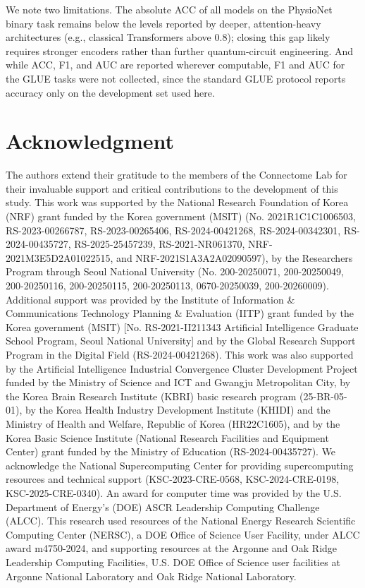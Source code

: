 \documentclass[conference]{IEEEtran}
\begin{document}
We note two limitations. The absolute ACC of all models on the PhysioNet binary task remains below the levels reported by deeper, attention-heavy architectures (e.g., classical Transformers above $0.8$); closing this gap likely requires stronger encoders rather than further quantum-circuit engineering. And while ACC, F1, and AUC are reported wherever computable, F1 and AUC for the GLUE tasks were not collected, since the standard GLUE protocol reports accuracy only on the development set used here.


\section*{\textbf{Acknowledgment}}
The authors extend their gratitude to the members of the Connectome Lab for their invaluable support and critical contributions to the development of this study. This work was supported by the National Research Foundation of Korea (NRF) grant funded by the Korea government (MSIT) (No. 2021R1C1C1006503, RS-2023-00266787, RS-2023-00265406, RS-2024-00421268, RS-2024-00342301, RS-2024-00435727, RS-2025-25457239, RS-2021-NR061370, NRF-2021M3E5D2A01022515, and NRF-2021S1A3A2A02090597), by the Researchers Program through Seoul National University (No. 200-20250071, 200-20250049, 200-20250116, 200-20250115, 200-20250113, 0670-20250039, 200-20260009). Additional support was provided by the Institute of Information \& Communications Technology Planning \& Evaluation (IITP) grant funded by the Korea government (MSIT) [No. RS-2021-II211343 Artificial Intelligence Graduate School Program, Seoul National University] and by the Global Research Support Program in the Digital Field (RS-2024-00421268). This work was also supported by the Artificial Intelligence Industrial Convergence Cluster Development Project funded by the Ministry of Science and ICT and Gwangju Metropolitan City, by the Korea Brain Research Institute (KBRI) basic research program (25-BR-05-01), by the Korea Health Industry Development Institute (KHIDI) and the Ministry of Health and Welfare, Republic of Korea (HR22C1605), and by the Korea Basic Science Institute (National Research Facilities and Equipment Center) grant funded by the Ministry of Education (RS-2024-00435727). We acknowledge the National Supercomputing Center for providing supercomputing resources and technical support (KSC-2023-CRE-0568, KSC-2024-CRE-0198, KSC-2025-CRE-0340). An award for computer time was provided by the U.S. Department of Energy’s (DOE) ASCR Leadership Computing Challenge (ALCC). This research used resources of the National Energy Research Scientific Computing Center (NERSC), a DOE Office of Science User Facility, under ALCC award m4750-2024, and supporting resources at the Argonne and Oak Ridge Leadership Computing Facilities, U.S. DOE Office of Science user facilities at Argonne National Laboratory and Oak Ridge National Laboratory.


\clearpage



\end{document}
